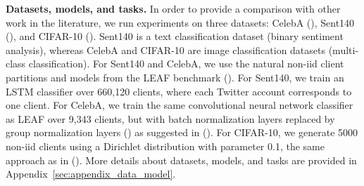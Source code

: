 \documentclass[twoside]{article}
\begin{document}

\textbf{Datasets, models, and tasks.}
In order to provide a comparison with other work in the literature, we run experiments on three datasets: CelebA (\cite{celeba}), Sent140 (\cite{sent140}), and CIFAR-10 (\cite{cifar10}). Sent140 is a text classification dataset (binary sentiment analysis), whereas CelebA and CIFAR-10 are image classification datasets (multi-class classification).
For Sent140 and CelebA, we use the natural non-iid client partitions and models from the LEAF benchmark (\cite{leaf}). 
For Sent140, we train an LSTM classifier over 660,120 clients, where each Twitter account corresponds to one client. For CelebA, we train the same convolutional neural network classifier as LEAF over 9,343 clients, but with batch normalization layers replaced by group normalization layers (\cite{groupnorm}) as suggested in (\cite{batchnorm_with_groupnorm}). For CIFAR-10, we generate 5000 non-iid clients using a Dirichlet distribution with parameter 0.1, the same approach as in (\cite{fedavgm}).
More details about datasets, models, and tasks are provided in Appendix~\ref{sec:appendix_data_model}. 
 

\end{document}

